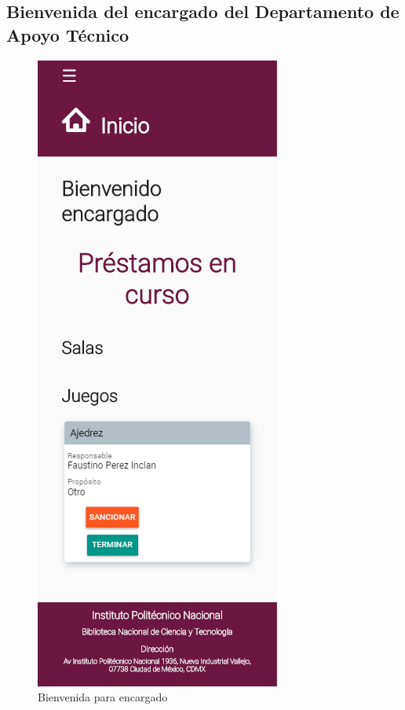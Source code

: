 
\subsection{Bienvenida del encargado del Departamento de 
	Apoyo Técnico}
	
	\begin{figure}[hbtp]
		\centering
		\includegraphics[scale=0.3]{images/InterfazMovil/IUGS00_binevenidaEncargado.png}
		\caption{Bienvenida para encargado}
	\end{figure}